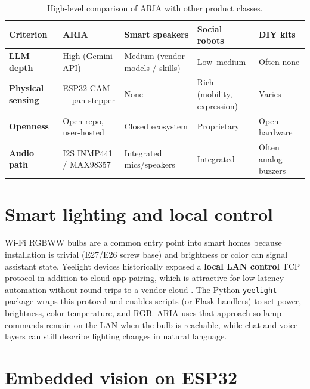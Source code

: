 \documentclass[12pt,a4paper]{report}
\begin{document}
\begin{table}[htbp]
\centering
\renewcommand{\arraystretch}{1.35}
\small
\begin{tabularx}{\textwidth}{|>{\raggedright\arraybackslash}m{3.1cm}|>{\raggedright\arraybackslash}X|>{\raggedright\arraybackslash}X|>{\raggedright\arraybackslash}X|>{\raggedright\arraybackslash}X|}
\hline
\rowcolor{tableblue}
\color{white}\textbf{Criterion} &
\color{white}\textbf{ARIA} &
\color{white}\textbf{Smart speakers} &
\color{white}\textbf{Social robots} &
\color{white}\textbf{DIY kits} \\ \hline

\textbf{LLM depth} & High (Gemini API) & Medium (vendor models / skills) & Low--medium & Often none \\ \hline
\textbf{Physical sensing} & ESP32-CAM + pan stepper & None & Rich (mobility, expression) & Varies \\ \hline
\textbf{Openness} & Open repo, user-hosted & Closed ecosystem & Proprietary & Open hardware \\ \hline
\textbf{Audio path} & I2S INMP441 / MAX98357 & Integrated mics/speakers & Integrated & Often analog buzzers \\ \hline
\end{tabularx}
\caption{High-level comparison of ARIA with other product classes.}
\label{tab:comparison_detailed}
\end{table}

\section{Smart lighting and local control}

Wi-Fi RGBWW bulbs are a common entry point into smart homes because installation is trivial (E27/E26 screw base) and brightness or color can signal assistant state. Yeelight devices historically exposed a \textbf{local LAN control} TCP protocol in addition to cloud app pairing, which is attractive for low-latency automation without round-trips to a vendor cloud \cite{yeelight}. The Python \texttt{yeelight} package wraps this protocol and enables scripts (or Flask handlers) to set power, brightness, color temperature, and RGB. ARIA uses that approach so lamp commands remain on the LAN when the bulb is reachable, while chat and voice layers can still describe lighting changes in natural language.

\section{Embedded vision on ESP32}
\end{document}
